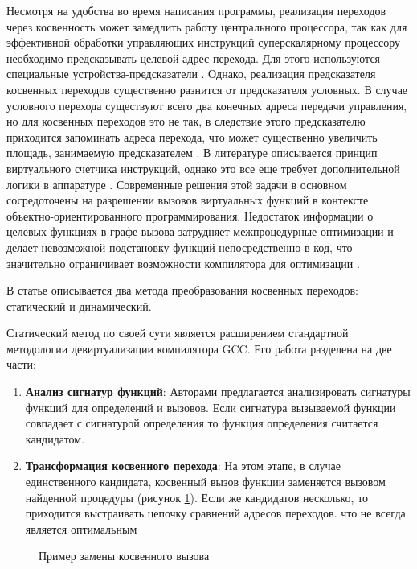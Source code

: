  Несмотря на удобства во время написания программы, реализация переходов через косвенность  может замедлить работу центрального процессора, так как для эффективной обработки управляющих инструкций суперскалярному процессору необходимо предсказывать целевой адрес перехода. Для этого используются специальные устройства-предсказатели \cite{mcfarling1993combining,mittal2019survey}. Однако, реализация предсказателя косвенных переходов существенно разнится от предсказателя условных. В случае условного перехода существуют всего два конечных адреса передачи управления, но для косвенных переходов это не так, в следствие этого предсказателю приходится запоминать адреса перехода, что может существенно увеличить площадь, занимаемую предсказателем \cite{driesen1998accurate}. В литературе описывается принцип виртуального счетчика инструкций, однако это все еще требует дополнительной логики в аппаратуре \cite{redmond2007vpc}.
 Современные решения этой задачи в основном сосредоточены на разрешении вызовов виртуальных функций в контексте объектно-ориентированного программирования. Недостаток информации о целевых функциях в графе вызова затрудняет межпроцедурные оптимизации и делает невозможной подстановку функций непосредственно в код, что значительно ограничивает возможности компилятора для оптимизации \cite{li2010lightweight,pande1996data}.



В статье \cite{chernonog2023статический} описывается два метода преобразования косвенных переходов: статический и динамический.  

Статический метод по своей сути является расширением стандартной методологии девиртуализации компилятора GCC. Его работа разделена на две части:

\begin{enumerate}
	\item \textbf{Анализ сигнатур функций}: Авторами предлагается анализировать сигнатуры функций для определений и вызовов. Если сигнатура вызываемой функции совпадает с сигнатурой определения то функция определения считается кандидатом.
	\item \textbf{Трансформация косвенного перехода}: На этом этапе, в случае единственного кандидата, косвенный вызов функции заменяется вызовом найденной процедуры (рисунок \ref{fig:ICP1}). Если же кандидатов несколько, то приходится выстраивать цепочку сравнений адресов переходов. что не всегда является оптимальным
\end{enumerate}


\begin{figure}[ht]
	\caption{Пример замены косвенного вызова}\label{fig:ICP1}
\end{figure}

